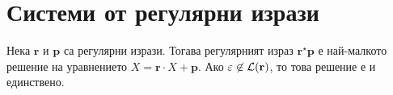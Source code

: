 \section{Системи от регулярни изрази}

\begin{important}
  \begin{lemma}
    \label{lem:regular:system:arden}
    Нека $\mathbf{r}$  и $\mathbf{p}$ са регулярни изрази.
    Тогава регулярният израз $\mathbf{r}^\star \mathbf{p}$ е най-малкото решение на уравнението $X = \mathbf{r} \cdot X + \mathbf{p}$.
    Ако $\varepsilon  \not \in \mathcal{L}(\mathbf{r})$, то това решение е и единствено.
  \end{lemma}
\end{important}
